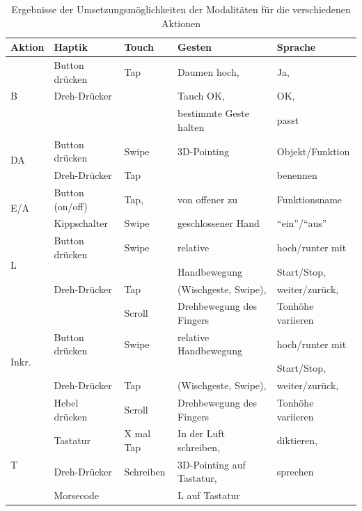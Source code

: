 \begin{table}[ht]
	\centering
	\begin{tabular}{|l|l|l|l|l|}
		\hline
		Aktion & Haptik & Touch & Gesten 			& Sprache\\
		\hline
				\multirow {3}{*}{B}
					& Button drücken		& Tap 				& Daumen hoch, 									& Ja,\\
					& Dreh-Drücker			& 						& Tauch OK, 										& OK,\\
					& 									& 						& bestimmte Geste halten 				& passt\\
		\hline
				\multirow{2}{*}{DA}
					& Button drücken		& Swipe  			& 3D-Pointing 								& Objekt/Funktion \\
					& Dreh-Drücker			& Tap					& 														& benennen \\		
		\hline
				\multirow{2}{*}{E/A}
					& Button (on/off)		& Tap,  			& von offener zu 								& Funktionsname\\
					& Kippschalter			& Swipe				& geschlossener Hand						& "`ein"'/"`aus"'\\
		\hline
				\multirow{3}{*}{L}
					& Button drücken		& Swipe				& relative  										& hoch/runter mit\\
					& 									& 						& Handbewegung									& Start/Stop,\\
					& Dreh-Drücker			& Tap 				& (Wischgeste, Swipe), 					& weiter/zurück,\\
					& 									& Scroll			& Drehbewegung des Fingers 			& Tonhöhe variieren\\		
		\hline
				\multirow{3}{*}{Inkr.}		
					& Button drücken		& Swipe				& relative Handbewegung 				& hoch/runter mit\\
					& 									& 						& 															& Start/Stop,\\
					& Dreh-Drücker			& Tap 				& (Wischgeste, Swipe), 					& weiter/zurück,\\
					& Hebel drücken			& Scroll			& Drehbewegung des Fingers			& Tonhöhe variieren\\					
		\hline
				\multirow{3}{*}{T}
					& Tastatur					& X mal Tap 	& In der Luft schreiben, 				& diktieren,\\
					& Dreh-Drücker			& Schreiben		& 3D-Pointing auf Tastatur,			& sprechen\\		
					& Morsecode					& 						& L auf Tastatur								&  \\	
		\hline			
  \end{tabular}
	\caption{Ergebnisse der Umsetzungsmöglichkeiten der Modalitäten für die verschiedenen Aktionen}
	\label{tab:table1}
\end{table}
